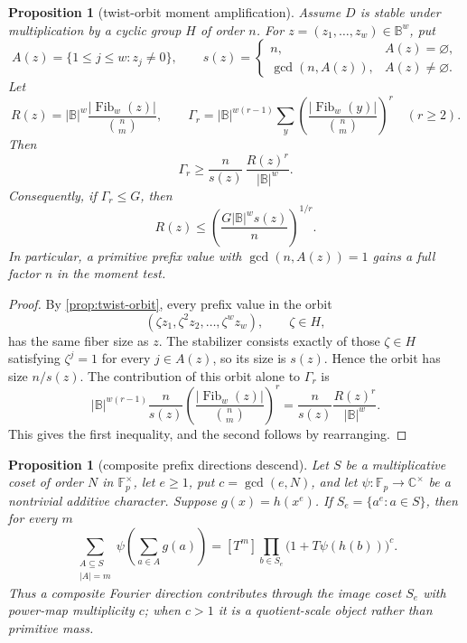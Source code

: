 \documentclass[a4paper,11pt]{amsart}
\newtheorem{proposition}[theorem]{Proposition}
\theoremstyle{remark}
\newcommand{\F}{\mathbb F}
\newcommand{\B}{\mathbb B}
\newcommand{\Fib}{\operatorname{Fib}}
\begin{document}
\begin{proposition}[twist-orbit moment amplification]\label{prop:q-orbit-moment}
Assume \(D\) is stable under multiplication by a cyclic group \(H\) of order \(n\).  For \(z=(z_1,\ldots,z_w)\in\B^w\), put
\[
        A(z)=\{1\le j\le w:z_j\ne0\},
        \qquad
        s(z)=
        \begin{cases}
        n, & A(z)=\varnothing,\\
        \gcd(n,A(z)), & A(z)\ne\varnothing .
        \end{cases}
\]
Let
\[
        R(z)=|\B|^w \frac{|\Fib_w(z)|}{\binom nm},
        \qquad
        \Gamma_r=|\B|^{w(r-1)}
        \sum_y\left(\frac{|\Fib_w(y)|}{\binom nm}\right)^r
        \quad(r\ge2).
\]
Then
\[
        \Gamma_r\ge \frac{n}{s(z)}\,\frac{R(z)^r}{|\B|^w}.
\]
Consequently, if \(\Gamma_r\le G\), then
\[
        R(z)\le\left(\frac{G|\B|^w s(z)}{n}\right)^{1/r}.
\]
In particular, a primitive prefix value with \(\gcd(n,A(z))=1\) gains a full factor \(n\) in the moment test.
\end{proposition}

\begin{proof}
By \cref{prop:twist-orbit}, every prefix value in the orbit
\[
        (\zeta z_1,\zeta^2z_2,\ldots,\zeta^wz_w),
        \qquad \zeta\in H,
\]
has the same fiber size as \(z\).  The stabilizer consists exactly of those \(\zeta\in H\) satisfying \(\zeta^j=1\) for every \(j\in A(z)\), so its size is \(s(z)\).  Hence the orbit has size \(n/s(z)\).  The contribution of this orbit alone to \(\Gamma_r\) is
\[
        |\B|^{w(r-1)}\frac{n}{s(z)}
        \left(\frac{|\Fib_w(z)|}{\binom nm}\right)^r
        =
        \frac{n}{s(z)}\frac{R(z)^r}{|\B|^w}.
\]
This gives the first inequality, and the second follows by rearranging.
\end{proof}

\begin{proposition}[composite prefix directions descend]\label{prop:composite-descend}
Let \(S\) be a multiplicative coset of order \(N\) in \(\F_p^\times\), let \(e\ge1\), put \(c=\gcd(e,N)\), and let \(\psi:\F_p\to\mathbb C^\times\) be a nontrivial additive character.  Suppose \(g(x)=h(x^e)\).  If \(S_e=\{a^e:a\in S\}\), then for every \(m\)
\[
        \sum_{\substack{A\subseteq S\\ |A|=m}}
        \psi\!\left(\sum_{a\in A}g(a)\right)
        =
        [T^m]\prod_{b\in S_e}\bigl(1+T\psi(h(b))\bigr)^c .
\]
Thus a composite Fourier direction contributes through the image coset \(S_e\)
with power-map multiplicity \(c\); when \(c>1\) it is a quotient-scale object
rather than primitive mass.
\end{proposition}
\end{document}
